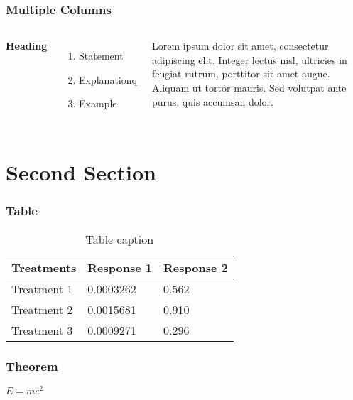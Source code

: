 \documentclass{beamer}
\begin{document}
	
	\begin{frame}
		\frametitle{Multiple Columns}
		\begin{columns}[c] %
			
			\textbf{Heading}
			\begin{enumerate}
				\item Statement
				\item Explanationq
				\item Example
			\end{enumerate}
			
			Lorem ipsum dolor sit amet, consectetur adipiscing elit. Integer lectus nisl, ultricies in feugiat rutrum, porttitor sit amet augue. Aliquam ut tortor mauris. Sed volutpat ante purus, quis accumsan dolor.
			
		\end{columns}
	\end{frame}
	
	\section{Second Section}
	
	\begin{frame}
		\frametitle{Table}
		\begin{table}
			\begin{tabular}{l l l}
				\toprule
				\textbf{Treatments} & \textbf{Response 1} & \textbf{Response 2}\\
				\midrule
				Treatment 1 & 0.0003262 & 0.562 \\
				Treatment 2 & 0.0015681 & 0.910 \\
				Treatment 3 & 0.0009271 & 0.296 \\
				\bottomrule
			\end{tabular}
			\caption{Table caption}
		\end{table}
	\end{frame}
	
	
	\begin{frame}
		\frametitle{Theorem}
		\begin{theorem}
			$E = mc^2$
		\end{theorem}
	\end{frame}
	
\end{document}
